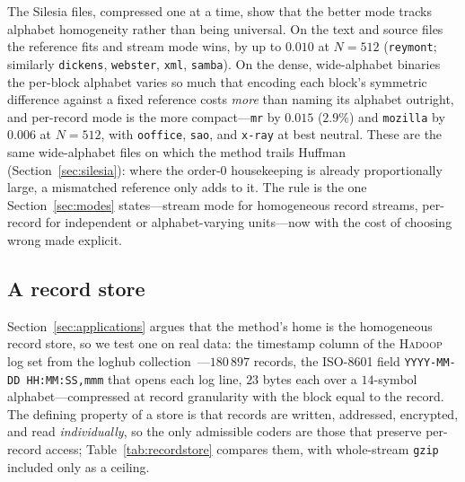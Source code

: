 \documentclass[entropy,article,submit,oneauthor,pdftex]{Definitions/mdpi}
\begin{document}
The Silesia files, compressed one at a time, show that the better mode tracks
alphabet homogeneity rather than being universal. On the text and source files the
reference fits and stream mode wins, by up to $0.010$ at $N{=}512$
(\texttt{reymont}; similarly \texttt{dickens}, \texttt{webster}, \texttt{xml},
\texttt{samba}). On the dense, wide-alphabet binaries the per-block alphabet varies
so much that encoding each block's symmetric difference against a fixed reference
costs \emph{more} than naming its alphabet outright, and per-record mode is the more
compact---\texttt{mr} by $0.015$ ($2.9\%$) and \texttt{mozilla} by $0.006$ at
$N{=}512$, with \texttt{ooffice}, \texttt{sao}, and \texttt{x-ray} at best neutral.
These are the same wide-alphabet files on which the method trails Huffman
(Section~\ref{sec:silesia}): where the order-$0$ housekeeping is already
proportionally large, a mismatched reference only adds to it. The rule is the one
Section~\ref{sec:modes} states---stream mode for homogeneous record streams,
per-record for independent or alphabet-varying units---now with the cost of choosing
wrong made explicit.

\subsection{A record store}\label{sec:recordstore}
Section~\ref{sec:applications} argues that the method's home is the homogeneous
record store, so we test one on real data: the timestamp column of the \textsc{Hadoop}
log set from the loghub collection~\cite{loghub2023}---$180\,897$ records, the ISO-8601
field \texttt{YYYY-MM-DD HH:MM:SS,mmm} that opens each log line, $23$ bytes each over a
$14$-symbol alphabet---compressed at record granularity with the block equal to the
record. The defining property of a store is
that records are written, addressed, encrypted, and read \emph{individually}, so the
only admissible coders are those that preserve per-record access;
Table~\ref{tab:recordstore} compares them, with whole-stream \texttt{gzip} included
only as a ceiling.
\end{document}
